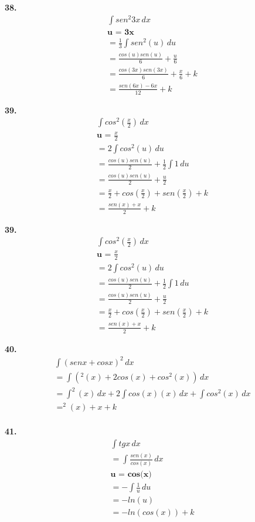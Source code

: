 \documentclass{article}
\begin{document}
\textbf{38.}
\begin{gather*}
    \int sen^2 3x\,dx
\\
    \textbf{u = 3x}
\\
    = \frac{1}{3} \int sen^2 (u) \,du
\\
    = \frac{cos(u)sen(u)}{6} + \frac{u}{6}
\\
    = \frac{cos(3x)sen(3x)}{6} + \frac{x}{6} + k
\\
    = \frac{sen(6x)-6x}{12} + k
\end{gather*}

\textbf{39.}
\begin{gather*}
    \int cos^2 (\frac{x}{2})\,dx
\\
    \textbf{u = } \frac{x}{2}
\\
    = 2 \int cos^2 (u) \,du
\\
    = \frac{cos(u)sen(u)}{2} + \frac{1}{2}\int 1\,du
\\
    = \frac{cos(u)sen(u)}{2} + \frac{u}{2}
\\
    = \frac{x}{2} + cos(\frac{x}{2}) + sen(\frac{x}{2}) + k
\\
    = \frac{sen(x) + x}{2} + k
\end{gather*}

\textbf{39.}
\begin{gather*}
    \int cos^2 (\frac{x}{2})\,dx
\\
    \textbf{u = } \frac{x}{2}
\\
    = 2 \int cos^2 (u) \,du
\\
    = \frac{cos(u)sen(u)}{2} + \frac{1}{2}\int 1\,du
\\
    = \frac{cos(u)sen(u)}{2} + \frac{u}{2}
\\
    = \frac{x}{2} + cos(\frac{x}{2}) + sen(\frac{x}{2}) + k
\\
    = \frac{sen(x) + x}{2} + k
\end{gather*}

\textbf{40.}
\begin{gather*}
    \int (senx + cosx)^2\,dx
\\
    = \int (^2(x) + 2cos(x)+cos^2(x))\,dx
\\
    = \int ^2(x)\,dx + 2\int cos(x)(x)\,dx + \int cos^2(x)\,dx
\\
    = ^2(x) + x + k
\\
\end{gather*}

\textbf{41.}
\begin{gather*}
    \int tg x\,dx
\\
    = \int \frac{sen(x)}{cos(x)} \,dx
\\
    \textbf {u = cos(x)}
\\
    = - \int \frac{1}{u} \,du
\\
    = -ln(u)
\\
    = -ln(cos(x)) + k
\\
\end{gather*}
\end{document}
